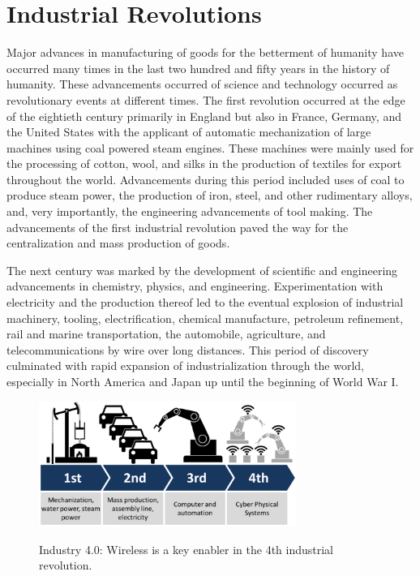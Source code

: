 \section{Industrial Revolutions}
Major advances in manufacturing of goods for the betterment of humanity have occurred many times in the last two hundred and fifty years in the history of humanity.  These advancements occurred of science and technology occurred as revolutionary events at different times.  The first revolution occurred at the edge of the eightieth century primarily in England but also in France, Germany, and the United States with the applicant of automatic mechanization of large machines using coal powered steam engines.  These machines were mainly used for the processing of cotton, wool, and silks in the production of textiles for export throughout the world.  Advancements during this period included uses of coal to produce steam power, the production of iron, steel, and other rudimentary alloys, and, very importantly, the engineering advancements of tool making.  The advancements of the first industrial revolution paved the way for the centralization and mass production of goods.

The next century was marked by the development of scientific and engineering advancements in chemistry, physics, and engineering. Experimentation with electricity and the production thereof led to the eventual explosion of industrial machinery, tooling, electrification, chemical manufacture, petroleum refinement, rail and marine transportation, the automobile, agriculture, and telecommunications by wire over long distances.  This period of discovery culminated with rapid expansion of industrialization through the world, especially in North America and Japan up until the beginning of World War I.

\begin{figure}[!tbp]
	\begin{center}
		\includegraphics[width=0.75\textwidth]{chapter-intro/images/forbes_2016_03_Industry_4.0}
		\label{fig:intro:forbes-i40-evolution}
		\caption{Industry 4.0: Wireless is a key enabler in the 4th industrial revolution.}
	\end{center}
\end{figure}

